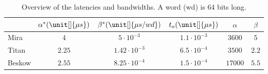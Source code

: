 \documentclass{sig-alternate}
\begin{document}
\begin{table}
\centering
\caption{Overview of the latencies and bandwidths. A word (wd) is 64 bits long.}
\begin{tabular}{l|ccccc} 
\hline
 & $\alpha^* (\unit[]{\mu s})$ & $\beta^* (\unit[]{\mu s/wd})$ & $t_a (\unit[]{\mu s})$ & $\alpha$ & $\beta$ \\
 \hline
 Mira   &  $4$   & $5\cdot 10^{-3}$                     & $1.1 \cdot 10^{-3}$ & $3600$ & $5$   \\ 
Titan  & $2.25$ & $1.42\cdot 10^{-3}$ & $6.5 \cdot 10^{-4}$ & $3500$ & $2.2$ \\ %
Beskow & $2.55$ & $8.25\cdot 10^{-4}$ & $1.5 \cdot 10^{-4}$ &$17000$ & $5.5$ \\ %
\hline
\end{tabular}
\label{tab:alpha_beta}
\end{table}
\end{document}
